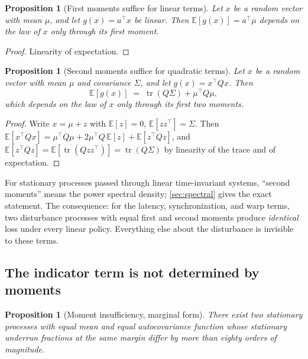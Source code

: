 \documentclass[11pt, a4paper]{article}
\theoremstyle{definition}
\theoremstyle{plain}
\newtheorem{proposition}[theorem]{Proposition}
\theoremstyle{remark}
\newcommand{\E}{\mathbb{E}}
\newcommand{\tr}{\operatorname{tr}}
\begin{document}
\begin{proposition}[First moments suffice for linear terms]
\label{prop:linear-first-moment}
Let $x$ be a random vector with mean $\mu$, and let $g(x) = a^\top x$ be
linear.  Then $\E[g(x)] = a^\top\mu$ depends on the law of $x$ only
through its first moment.
\end{proposition}

\begin{proof} Linearity of expectation. \end{proof}

\begin{proposition}[Second moments suffice for quadratic terms]
\label{prop:quadratic-second-moment}
Let $x$ be a random vector with mean $\mu$ and covariance $\Sigma$, and
let $g(x) = x^\top Q x$.  Then
\begin{equation}\label{eq:trace-formula}
  \E[g(x)] \;=\; \tr(Q\Sigma) + \mu^\top Q \mu ,
\end{equation}
which depends on the law of $x$ only through its first two moments.
\end{proposition}

\begin{proof}
Write $x = \mu + z$ with $\E[z]=0$, $\E[zz^\top]=\Sigma$.  Then
$\E[x^\top Qx] = \mu^\top Q\mu + 2\mu^\top Q\,\E[z] + \E[z^\top Qz]$,
and $\E[z^\top Qz] = \E[\tr(Qzz^\top)] = \tr(Q\Sigma)$ by linearity of
the trace and of expectation.
\end{proof}

For stationary processes passed through linear time-invariant systems,
``second moments'' means the power spectral density; \cref{sec:spectral}
gives the exact statement.  The consequence: for the latency,
synchronization, and warp terms, two disturbance processes with equal
first and second moments produce \emph{identical} loss under every linear
policy.  Everything else about the disturbance is invisible to these
terms.

\subsection{The indicator term is not determined by moments}
\label{sec:indicator-not-moments}

\begin{proposition}[Moment insufficiency, marginal form]
\label{prop:counterexample}
There exist two stationary processes with equal mean and equal
autocovariance function whose stationary underrun fractions at the same
margin differ by more than eighty orders of magnitude.
\end{proposition}
\end{document}
